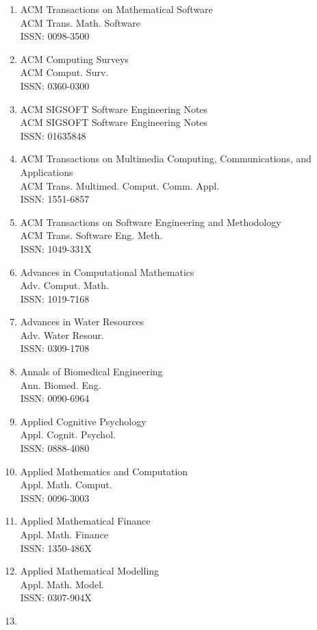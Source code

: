 \begin{enumerate}
\item
 ACM Transactions on Mathematical Software\\
 ACM Trans. Math. Software\\
 ISSN: 0098-3500
\item
 ACM Computing Surveys\\
 ACM Comput. Surv.\\
 ISSN: 0360-0300
\item
 ACM SIGSOFT Software Engineering Notes\\
 ACM SIGSOFT Software Engineering Notes\\
 ISSN: 01635848
\item
 ACM Transactions on Multimedia Computing, Communications, and Applications\\
 ACM Trans. Multimed. Comput. Comm. Appl.\\
 ISSN: 1551-6857
\item
 ACM Transactions on Software Engineering and Methodology\\
 ACM Trans. Software Eng. Meth.\\
 ISSN: 1049-331X
\item
 Advances in Computational Mathematics\\
 Adv. Comput. Math.\\
 ISSN: 1019-7168
\item
 Advances in Water Resources\\
 Adv. Water Resour.\\
 ISSN: 0309-1708
\item
 Annals of Biomedical Engineering\\
 Ann. Biomed. Eng.\\
 ISSN: 0090-6964
\item
 Applied Cognitive Psychology\\
 Appl. Cognit. Psychol.\\
 ISSN: 0888-4080
\item
 Applied Mathematics and Computation\\
 Appl. Math. Comput.\\
 ISSN: 0096-3003
\item
 Applied Mathematical Finance\\
 Appl. Math. Finance\\
 ISSN: 1350-486X
\item
 Applied Mathematical Modelling\\
 Appl. Math. Model.\\
 ISSN: 0307-904X
\item

\end{enumerate}
